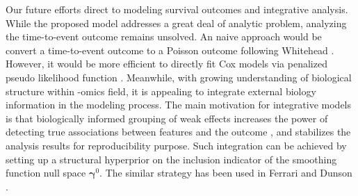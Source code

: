 \documentclass[AMA,STIX1COL,]{WileyNJD-v2}
\begin{document}
Our future efforts direct to modeling survival outcomes and integrative
analysis. While the proposed model addresses a great deal of analytic
problem, analyzing the time-to-event outcome remains unsolved. An naive
approach would be convert a time-to-event outcome to a Poisson outcome
following Whitehead \citep{Whitehead1980}. However, it would be more
efficient to directly fit Cox models via penalized pseudo likelihood
function \citep{Simon2011}. Meanwhile, with growing understanding of
biological structure within -omics field, it is appealing to integrate
external biology information in the modeling process. The main
motivation for integrative models is that biologically informed grouping
of weak effects increases the power of detecting true associations
between features and the outcome \citep{Peterson2016}, and stabilizes
the analysis results for reproducibility purpose. Such integration can
be achieved by setting up a structural hyperprior on the inclusion
indicator of the smoothing function null space
\(\boldsymbol{\gamma}^0\). The similar strategy has been used in Ferrari
and Dunson \citep{Ferrari2020}.

\clearpage



\clearpage
\end{document}
